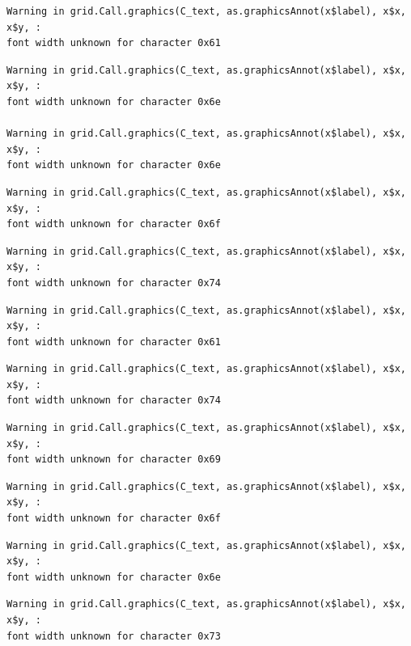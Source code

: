 \documentclass[
  letterpaper,
  DIV=11,
  numbers=noendperiod]{scrreprt}
\begin{document}
\begin{verbatim}
Warning in grid.Call.graphics(C_text, as.graphicsAnnot(x$label), x$x, x$y, :
font width unknown for character 0x61
\end{verbatim}

\begin{verbatim}
Warning in grid.Call.graphics(C_text, as.graphicsAnnot(x$label), x$x, x$y, :
font width unknown for character 0x6e

Warning in grid.Call.graphics(C_text, as.graphicsAnnot(x$label), x$x, x$y, :
font width unknown for character 0x6e
\end{verbatim}

\begin{verbatim}
Warning in grid.Call.graphics(C_text, as.graphicsAnnot(x$label), x$x, x$y, :
font width unknown for character 0x6f
\end{verbatim}

\begin{verbatim}
Warning in grid.Call.graphics(C_text, as.graphicsAnnot(x$label), x$x, x$y, :
font width unknown for character 0x74
\end{verbatim}

\begin{verbatim}
Warning in grid.Call.graphics(C_text, as.graphicsAnnot(x$label), x$x, x$y, :
font width unknown for character 0x61
\end{verbatim}

\begin{verbatim}
Warning in grid.Call.graphics(C_text, as.graphicsAnnot(x$label), x$x, x$y, :
font width unknown for character 0x74
\end{verbatim}

\begin{verbatim}
Warning in grid.Call.graphics(C_text, as.graphicsAnnot(x$label), x$x, x$y, :
font width unknown for character 0x69
\end{verbatim}

\begin{verbatim}
Warning in grid.Call.graphics(C_text, as.graphicsAnnot(x$label), x$x, x$y, :
font width unknown for character 0x6f
\end{verbatim}

\begin{verbatim}
Warning in grid.Call.graphics(C_text, as.graphicsAnnot(x$label), x$x, x$y, :
font width unknown for character 0x6e
\end{verbatim}

\begin{verbatim}
Warning in grid.Call.graphics(C_text, as.graphicsAnnot(x$label), x$x, x$y, :
font width unknown for character 0x73
\end{verbatim}
\end{document}
